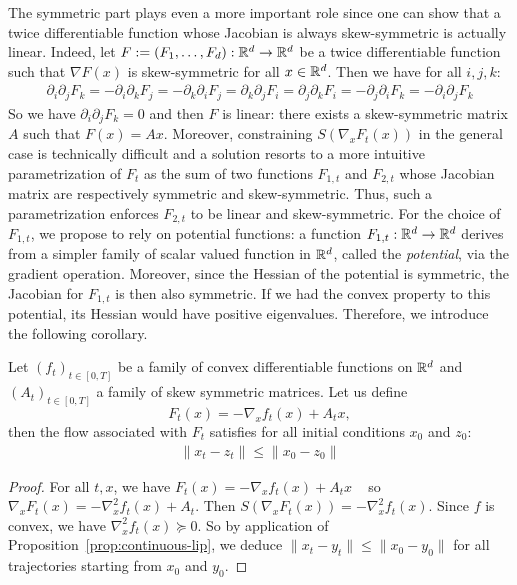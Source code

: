 The symmetric part plays even a more important role since one can show that a twice differentiable function whose Jacobian is always skew-symmetric is actually linear. Indeed, let $F:=(F_1,\dots,F_d):\mathbb{R}^d\to\mathbb{R}^d$ be a twice differentiable function such that $\nabla F(x)$ is skew-symmetric for all $x\in\mathbb{R}^d$. Then we have for all $i,j,k$:
\begin{align*}
    \partial_i\partial_j F_k =  -\partial_i\partial_k F_j =-\partial_k\partial_i F_j = \partial_k\partial_j F_i = \partial_j\partial_k F_i = -\partial_j\partial_i F_k = -\partial_i\partial_j F_k
\end{align*}
So we have $\partial_i\partial_j F_k =0$ and then $F$ is linear: there exists a skew-symmetric matrix $A$ such that $F(x)=Ax$.
Moreover, constraining $S(\nabla_x F_{t}(x))$ in the general case is technically difficult and a solution resorts to a more intuitive parametrization of  $F_t$ as the sum of two functions $F_{1,t}$ and $F_{2,t}$ whose Jacobian matrix are respectively symmetric  and skew-symmetric.  Thus, such a parametrization enforces $F_{2,t}$  to be linear and skew-symmetric. For the choice of $F_{1,t}$, we propose to rely on potential functions: a function  $F_{1,t}:\mathbb{R}^d \to \mathbb{R}^d$ derives from a simpler family of scalar valued function in $\mathbb{R}^d$, called the \emph{potential}, via the gradient operation. Moreover, since the Hessian of the potential is symmetric, the Jacobian for $F_{1,t}$ is then also symmetric.  If we had the convex property to this potential, its Hessian would have positive eigenvalues. Therefore, we introduce the following corollary. 

\begin{corollary} 
\label{cor:conv-skew}Let $(f_{t})_{t\in[0,T]}$ be a family of convex differentiable functions on $\mathbb{R}^d$ and $(A_t)_{t\in[0,T]}$ a family of skew symmetric matrices. Let us define 
$$F_t(x) = -\nabla_x f_{t}(x)+A_t x,$$ 
then the flow associated with $F_t$ satisfies for all initial conditions $x_0$ and $z_0$:
\begin{align*}
\lVert x_t-z_t \rVert\leq \lVert x_0-z_0 \rVert
\end{align*}
\end{corollary}
\begin{proof}

  For all $t,x$, we have $F_t(x) = -\nabla_x f_{t}(x)+A_t x$ ~ so~
  $\nabla_x F_t(x) = -\nabla_x^2 f_{t}(x)+A_t$. Then $S(\nabla_x F_t(x)) =-\nabla_x^2 f_{t}(x)$. Since $f$ is convex, we have $\nabla_x^2 f_{t}(x)\succeq 0$. So by application of Proposition~\ref{prop:continuous-lip}, we deduce $\lVert x_t-y_t \rVert\leq \lVert x_0-y_0 \rVert$ for all trajectories starting from $x_0$ and $y_0$.
\end{proof}


